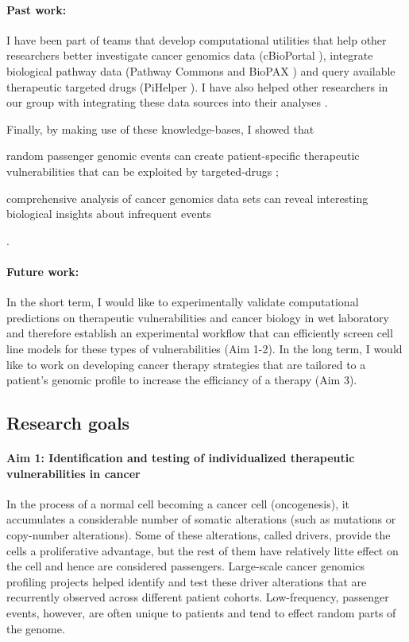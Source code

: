 \documentclass[11pt,letterpaper]{article}
\begin{document}
\paragraph{Past work: }I have been part of teams that develop computational utilities that help other researchers better 
investigate cancer genomics data (cBioPortal \cite{gao2014cbioportal, cerami2012cbio}),
integrate biological pathway data (Pathway Commons and BioPAX \cite{demir2013using,babur2014integrating})
and query available therapeutic targeted drugs (PiHelper \cite{aksoy2013pihelper}).
I have also helped other researchers in our group with integrating these data sources into their analyses \cite{ciriello2013emerging,korkut2014perturbation,babur2014systematic}.

Finally, by making use of these knowledge-bases, 
I showed that 
\begin{inparaenum}[(i)]
 \item random passenger genomic events can create patient-specific therapeutic vulnerabilities that can be exploited by targeted-drugs \cite{aksoy2014prediction};
 \item comprehensive analysis of cancer genomics data sets can reveal interesting biological insights about infrequent events \cite{aksoy2014cancer}
\end{inparaenum}.

\paragraph{Future work:} 
In the short term, I would like to experimentally validate computational predictions on therapeutic vulnerabilities and cancer biology in wet laboratory
and therefore establish an experimental workflow that can efficiently screen cell line models for these types of vulnerabilities (Aim 1-2).
In the long term, I would like to work on developing cancer therapy strategies that are tailored to a patient's genomic profile to increase the efficiancy of a therapy (Aim 3).

\subsection*{Research goals}
\paragraph{Aim 1: Identification and testing of individualized therapeutic vulnerabilities in cancer}
In the process of a normal cell becoming a cancer cell (oncogenesis),
it accumulates a considerable number of somatic alterations (such as mutations or copy-number alterations).
Some of these alterations, called drivers, provide the cells a proliferative advantage,
but the rest of them have relatively litte effect on the cell and hence are considered passengers.
Large-scale cancer genomics profiling projects helped identify and test these driver alterations that are recurrently observed across different patient cohorts.
Low-frequency, passenger events, however, are often unique to patients and tend to effect random parts of the genome.
\end{document}
